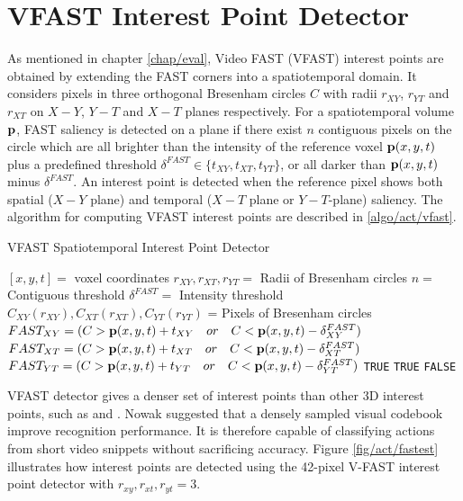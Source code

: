 \section{VFAST Interest Point Detector}
\label{sec/act/fastest}
As mentioned in chapter \ref{chap/eval}, Video FAST (VFAST) interest points are obtained by extending the FAST corners \cite{Rosten2006} into a spatiotemporal domain. It considers pixels in three orthogonal Bresenham circles $C$ with radii $r_{XY}$, $r_{YT}$ and $r_{XT}$ on $X-Y$, $Y-T$ and $X-T$ planes respectively.
For a spatiotemporal volume $\mathbf{p}$, FAST saliency is detected on a plane if there exist $n$ contiguous pixels on the circle which are all brighter than the intensity of the reference voxel $\mathbf{p}(x,y,t)$ plus a predefined threshold $\delta^{FAST} \in \{ t_{XY}, t_{XT}, t_{YT} \}$, or all darker than $\mathbf{p}(x,y,t)$ minus $\delta^{FAST}$. An interest point is detected when the reference pixel shows both spatial ($X-Y$ plane) and temporal ($X-T$ plane or $Y-T$-plane) saliency. The algorithm for computing VFAST interest points are described in \ref{algo/act/vfast}.

\begin{algorithm}
\caption{VFAST Spatiotemporal Interest Point Detector}
\label{algo/act/vfast}
\begin{algorithmic}
	\REQUIRE $[x,y,t] = $ voxel coordinates
	\REQUIRE $r_{XY},r_{XT},r_{YT} = $ Radii of Bresenham circles
	\REQUIRE $n = $ Contiguous threshold
	\REQUIRE $\delta^{FAST} = $ Intensity threshold
	\STATE $C_{XY}(r_{XY}),C_{XT}(r_{XT}),C_{YT}(r_{YT})$ = Pixels of Bresenham circles
	\STATE $FAST_{XY} = ( C > \mathbf{p}(x,y,t)+t_{XY}\quad or\quad C < \mathbf{p}(x,y,t)-\delta^{FAST}_{XY} )$
	\STATE $FAST_{XT} = ( C > \mathbf{p}(x,y,t)+t_{XT}\quad or\quad C < \mathbf{p}(x,y,t)-\delta^{FAST}_{XT} )$
	\STATE $FAST_{YT} = ( C > \mathbf{p}(x,y,t)+t_{YT}\quad or\quad C < \mathbf{p}(x,y,t)-\delta^{FAST}_{YT} )$
		\RETURN \texttt{TRUE}
		\RETURN \texttt{TRUE}
	\ELSE
		\RETURN \texttt{FALSE}
	\ENDIF
\ENDIF
\end{algorithmic}
\end{algorithm}

VFAST detector gives a denser set of interest points than other 3D interest points, such as \cite{Laptev2005} and \cite{Dollar2005}. Nowak \etal \cite{Nowak2006} suggested that a densely sampled visual codebook improve recognition performance. It is therefore capable of classifying actions from short video snippets without sacrificing accuracy. Figure \ref{fig/act/fastest} illustrates how interest points are detected using the 42-pixel V-FAST interest point detector with $r_{xy},r_{xt},r_{yt} = 3$. 

